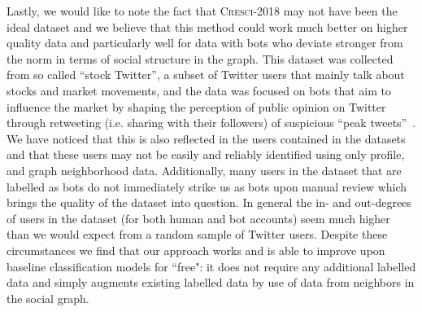 Lastly, we would like to note the fact that \textsc{Cresci-2018} may not have been the ideal dataset and we believe that this method could work much better on higher quality data and particularly well for data with bots who deviate stronger from the norm in terms of social structure in the graph. This dataset was collected from so called ``stock Twitter'', a subset of Twitter users that mainly talk about stocks and market movements, and the data was focused on bots that aim to influence the market by shaping the perception of public opinion on Twitter through retweeting (i.e. sharing with their followers) of suspicious ``peak tweets''~\cite{cresci2018fake}. We have noticed that this is also reflected in the users contained in the datasets and that these users may not be easily and reliably identified using only profile, and graph neighborhood data. Additionally, many users in the dataset that are labelled as bots do not immediately strike us as bots upon manual review which brings the quality of the dataset into question. In general the in- and out-degrees of users in the dataset (for both human and bot accounts) seem much higher than we would expect from a random sample of Twitter users. Despite these circumstances we find that our approach works and is able to improve upon baseline classification models for ``free": it does not require any additional labelled data and simply augments existing labelled data by use of data from neighbors in the social graph. 